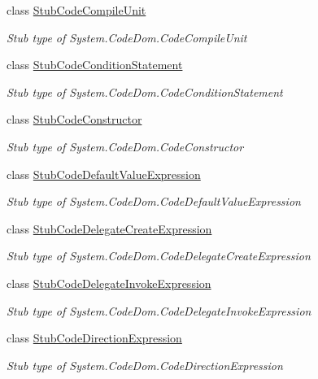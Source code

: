 \begin{DoxyCompactItemize}
class \hyperlink{class_system_1_1_code_dom_1_1_fakes_1_1_stub_code_compile_unit}{Stub\-Code\-Compile\-Unit}
\begin{DoxyCompactList}\small\item\em Stub type of System.\-Code\-Dom.\-Code\-Compile\-Unit\end{DoxyCompactList}\item 
class \hyperlink{class_system_1_1_code_dom_1_1_fakes_1_1_stub_code_condition_statement}{Stub\-Code\-Condition\-Statement}
\begin{DoxyCompactList}\small\item\em Stub type of System.\-Code\-Dom.\-Code\-Condition\-Statement\end{DoxyCompactList}\item 
class \hyperlink{class_system_1_1_code_dom_1_1_fakes_1_1_stub_code_constructor}{Stub\-Code\-Constructor}
\begin{DoxyCompactList}\small\item\em Stub type of System.\-Code\-Dom.\-Code\-Constructor\end{DoxyCompactList}\item 
class \hyperlink{class_system_1_1_code_dom_1_1_fakes_1_1_stub_code_default_value_expression}{Stub\-Code\-Default\-Value\-Expression}
\begin{DoxyCompactList}\small\item\em Stub type of System.\-Code\-Dom.\-Code\-Default\-Value\-Expression\end{DoxyCompactList}\item 
class \hyperlink{class_system_1_1_code_dom_1_1_fakes_1_1_stub_code_delegate_create_expression}{Stub\-Code\-Delegate\-Create\-Expression}
\begin{DoxyCompactList}\small\item\em Stub type of System.\-Code\-Dom.\-Code\-Delegate\-Create\-Expression\end{DoxyCompactList}\item 
class \hyperlink{class_system_1_1_code_dom_1_1_fakes_1_1_stub_code_delegate_invoke_expression}{Stub\-Code\-Delegate\-Invoke\-Expression}
\begin{DoxyCompactList}\small\item\em Stub type of System.\-Code\-Dom.\-Code\-Delegate\-Invoke\-Expression\end{DoxyCompactList}\item 
class \hyperlink{class_system_1_1_code_dom_1_1_fakes_1_1_stub_code_direction_expression}{Stub\-Code\-Direction\-Expression}
\begin{DoxyCompactList}\small\item\em Stub type of System.\-Code\-Dom.\-Code\-Direction\-Expression\end{DoxyCompactList}\item 

\end{DoxyCompactItemize}
